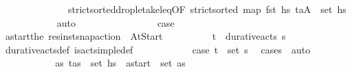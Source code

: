 \begin{isabellebody}
\ \ \ \ \ \ \ \ \ \ \ \ \ \ strict{\isacharunderscore}{\kern0pt}sorted{\isacharunderscore}{\kern0pt}drop{\isacharunderscore}{\kern0pt}le{\isacharunderscore}{\kern0pt}take{\isacharunderscore}{\kern0pt}leq{\isacharbrackleft}{\kern0pt}OF\ {\isacartoucheopen}strict{\isacharunderscore}{\kern0pt}sorted\ {\isacharparenleft}{\kern0pt}map\ fst\ hs\ {\isacartoucheopen}{\isacharparenleft}{\kern0pt}t\isactrlsub a{\isacharcomma}{\kern0pt}A{\isacharprime}{\kern0pt}{\isacharparenright}{\kern0pt}\ {\isasymin}\ set\ hs\isanewline
\ \ \ \ \ \ \ \ \ \ \isamarkupfalse%
\ auto\isanewline
\ \ \ \ \ \ \isamarkupfalse%
\isanewline
\ \ \ \ \ \ \ \ \isamarkupfalse%
\ {\isacharquery}{\kern0pt}case{}\isanewline
\ \ \ \ \ \ \ \ \isamarkupfalse%
\ {\isacharquery}{\kern0pt}a\isactrlsub s\isactrlsub t\isactrlsub a\isactrlsub r\isactrlsub t{\isacharequal}{\kern0pt}{\isachardoublequoteopen}the\ {\isacharparenleft}{\kern0pt}res{\isacharunderscore}{\kern0pt}inst{\isacharunderscore}{\kern0pt}snap{\isacharunderscore}{\kern0pt}action\ {\isasympi}\ At{\isacharunderscore}{\kern0pt}Start{\isacharparenright}{\kern0pt}{\isachardoublequoteclose}\isanewline
\ \ \ \ \ \ \ \ \isamarkupfalse%
\ {\isachardoublequoteopen}{\isacharparenleft}{\kern0pt}t\isactrlsub {\isasympi}{\isacharcomma}{\kern0pt}{\isasympi}{\isacharparenright}{\kern0pt}\ {\isasymin}\ durative{\isacharunderscore}{\kern0pt}acts\ {\isasympi}s{\isachardoublequoteclose}\isanewline
\ \ \ \ \ \ \ \ \ \ \isamarkupfalse%
\ durative{\isacharunderscore}{\kern0pt}acts{\isacharunderscore}{\kern0pt}def\ is{\isacharunderscore}{\kern0pt}act{\isacharunderscore}{\kern0pt}simple{\isacharunderscore}{\kern0pt}def\isanewline
\ \ \ \ \ \ \ \ \ \ \isamarkupfalse%
\ {\isacartoucheopen}{\isacharquery}{\kern0pt}case{}{\isacartoucheclose}\ {\isacartoucheopen}{\isacharparenleft}{\kern0pt}t\isactrlsub {\isasympi}{\isacharcomma}{\kern0pt}{\isasympi}{\isacharparenright}{\kern0pt}\ {\isasymin}\ set\ {\isasympi}s{\isacartoucheclose}\ \isamarkupfalse%
\ {\isacharparenleft}{\kern0pt}cases\ {\isasympi}{\isacharparenright}{\kern0pt}\ auto\isanewline
\ \ \ \ \ \ \ \ \isamarkupfalse%
\ \isamarkupfalse%
\ {\isachardoublequoteopen}{\isasymexists}as{\isachardot}{\kern0pt}\ {\isacharparenleft}{\kern0pt}t\isactrlsub {\isasympi}{\isacharcomma}{\kern0pt}as{\isacharparenright}{\kern0pt}\ {\isasymin}\ set\ hs\ {\isasymand}\ {\isacharquery}{\kern0pt}a\isactrlsub s\isactrlsub t\isactrlsub a\isactrlsub r\isactrlsub t\ {\isasymin}\ set\ as{\isachardoublequoteclose}\isanewline

\end{isabellebody}
